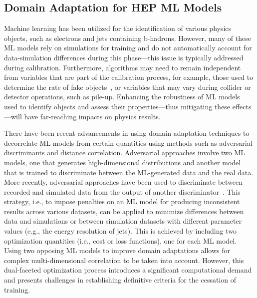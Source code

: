 \documentclass[letter, USenglish, 11pt, subfigure]{article}
\begin{document}
\subsection{Domain Adaptation for HEP ML Models}
Machine learning has been utilized for the identification of various physics objects, such as electrons and jets containing b-hadrons. However, many of these ML models rely on simulations for training and do not automatically account for data-simulation differences during this phase—this issue is typically addressed during calibration. Furthermore, algorithms may need to remain independent from variables that are part of the calibration process, for example, those used to determine the rate of fake objects~\cite{atlas_photon_id}, or variables that may vary during collider or detector operations, such as pile-up. Enhancing the robustness of ML models used to identify objects and assess their properties—thus mitigating these effects—will have far-reaching impacts on physics results.

There have been recent advancements in using domain-adaptation techniques to decorrelate ML models from certain quantities using methods such as adversarial discriminants and distance correlation. Adversarial approaches involve two ML models, one that generates high-dimensional distributions and another model that is trained to discriminate between the ML-generated data and the real data. More recently, adversarial approaches have been used to discriminate between recorded and simulated data from the output of another discriminator~\cite{calRatio}. This strategy, i.e., to impose penalties on an ML model for producing inconsistent results across various datasets, can be applied to minimize differences between data and simulations or between simulation datasets with different parameter values (e.g., the energy resolution of jets). This is achieved by including two optimization quantities (i.e., cost or loss functions), one for each ML model. Using two opposing ML models to improve domain adaptations allows for complex multi-dimensional correlation to be taken into account. However, this dual-faceted optimization process introduces a significant computational demand and presents challenges in establishing definitive criteria for the cessation of training.
\end{document}
